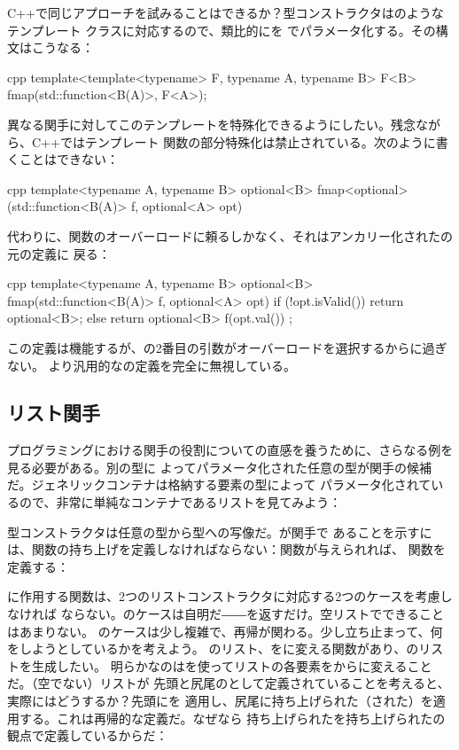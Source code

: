 C++で同じアプローチを試みることはできるか？型コンストラクタはのようなテンプレート
クラスに対応するので、類比的にを
でパラメータ化する。その構文はこうなる：

\begin{snip}{cpp}
template<template<typename> F, typename A, typename B>
F<B> fmap(std::function<B(A)>, F<A>);
\end{snip}
異なる関手に対してこのテンプレートを特殊化できるようにしたい。残念ながら、C++ではテンプレート
関数の部分特殊化は禁止されている。次のように書くことはできない：

\begin{snip}{cpp}
template<typename A, typename B>
optional<B> fmap<optional>(std::function<B(A)> f, optional<A> opt)
\end{snip}
代わりに、関数のオーバーロードに頼るしかなく、それはアンカリー化されたの元の定義に
戻る：

\begin{snip}{cpp}
template<typename A, typename B>
optional<B> fmap(std::function<B(A)> f, optional<A> opt) {
    if (!opt.isValid())
        return optional<B>{};
    else
        return optional<B>{ f(opt.val()) };
}
\end{snip}
この定義は機能するが、の2番目の引数がオーバーロードを選択するからに過ぎない。
より汎用的なの定義を完全に無視している。

\subsection{リスト関手}

プログラミングにおける関手の役割についての直感を養うために、さらなる例を見る必要がある。別の型に
よってパラメータ化された任意の型が関手の候補だ。ジェネリックコンテナは格納する要素の型によって
パラメータ化されているので、非常に単純なコンテナであるリストを見てみよう：

型コンストラクタは任意の型から型への写像だ。が関手で
あることを示すには、関数の持ち上げを定義しなければならない：関数が与えられれば、
関数を定義する：

に作用する関数は、2つのリストコンストラクタに対応する2つのケースを考慮しなければ
ならない。のケースは自明だ――を返すだけ。空リストでできることはあまりない。
のケースは少し複雑で、再帰が関わる。少し立ち止まって、何をしようとしているかを考えよう。
のリスト、をに変える関数があり、のリストを生成したい。
明らかなのはを使ってリストの各要素をからに変えることだ。（空でない）リストが
先頭と尻尾のとして定義されていることを考えると、実際にはどうするか？先頭にを
適用し、尻尾に持ち上げられた（された）を適用する。これは再帰的な定義だ。なぜなら
持ち上げられたを持ち上げられたの観点で定義しているからだ：

